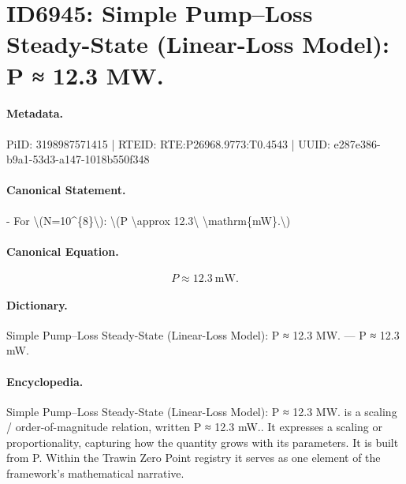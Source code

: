 \section*{ID6945: Simple Pump–Loss Steady-State (Linear-Loss Model): P ≈ 12.3 MW.}
\paragraph{Metadata.}
PiID: 3198987571415 | RTEID: RTE:P26968.9773:T0.4543 | UUID: e287e386-b9a1-53d3-a147-1018b550f348

\paragraph{Canonical Statement.}
- For \textbackslash{}(N=10\textasciicircum{}\{8\}\textbackslash{}): \textbackslash{}(P \textbackslash{}approx 12.3\textbackslash{} \textbackslash{}mathrm\{mW\}.\textbackslash{})

\paragraph{Canonical Equation.}
\[
P \approx 12.3\ \mathrm{mW}.
\]

\paragraph{Dictionary.}
Simple Pump–Loss Steady-State (Linear-Loss Model): P ≈ 12.3 MW. — P ≈ 12.3 mW.

\paragraph{Encyclopedia.}
Simple Pump–Loss Steady-State (Linear-Loss Model): P ≈ 12.3 MW. is a scaling / order-of-magnitude relation, written P ≈ 12.3 mW.. It expresses a scaling or proportionality, capturing how the quantity grows with its parameters. It is built from P. Within the Trawin Zero Point registry it serves as one element of the framework's mathematical narrative.

